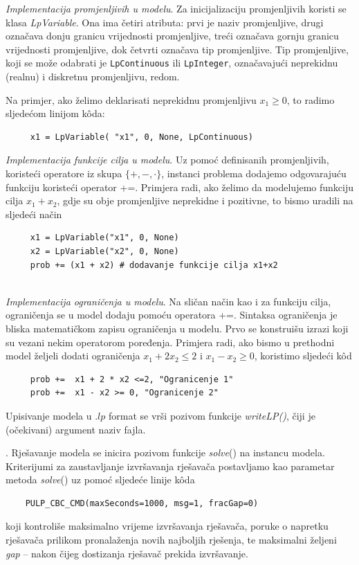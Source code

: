 \documentclass[a4paper, utf8, 11pt, colorlinks]{book}
\theoremstyle{definition}
\begin{document}
 {\emph{Implementacija promjenljivih u modelu}}.  Za inicijalizaciju promjenljivih koristi se klasa \emph{LpVariable}. Ona ima četiri atributa: prvi je naziv promjenljive, drugi označava donju granicu vrijednosti promjenljive, treći označava gornju granicu vrijednosti promjenljive, dok četvrti označava tip promjenljive. Tip promjenljive, koji se može odabrati je \texttt{LpContinuous} ili \texttt{LpInteger}, označavajući neprekidnu (realnu) i diskretnu promjenljivu, redom.  

Na primjer, ako želimo deklarisati neprekidnu promjenljivu $x_1\geq 0$, to radimo sljedećom linijom k\^oda:

\begin{verbatim}
	 x1 = LpVariable( "x1", 0, None, LpContinuous)
\end{verbatim}
 
  {\emph{Implementacija funkcije cilja u modelu}}. Uz pomoć definisanih promjenljivih, koristeći operatore iz skupa $\{+,-, \cdot\}$, instanci problema dodajemo odgovarajuću funkciju  koristeći operator +=. Primjera radi, ako želimo da modelujemo funkciju cilja $x_1 + x_2$, gdje su obje promjenljive neprekidne i pozitivne, to bismo uradili na sljedeći način
\begin{verbatim}
	 x1 = LpVariable("x1", 0, None)
	 x2 = LpVariable("x2", 0, None) 
	 prob += (x1 + x2) # dodavanje funkcije cilja x1+x2 
\end{verbatim} \\ \vspace{-1.5cm}
  {\emph{Implementacija ograničenja u modelu}}.  Na sličan način kao i za funkciju cilja, ograničenja se  u model dodaju pomoću operatora +=. Sintaksa ograničenja je bliska matematičkom zapisu ograničenja u modelu. Prvo se konstruišu izrazi koji su vezani nekim operatorom poređenja. Primjera radi, ako bismo u prethodni model željeli dodati ograničenja $x_1 + 2 x_2 \leq 2$ i $x_1-x_2 \geq 0$, koristimo sljedeći k\^od
\begin{verbatim}
	 prob +=  x1 + 2 * x2 <=2, "Ogranicenje 1"
	 prob +=  x1 - x2 >= 0, "Ogranicenje 2" 
\end{verbatim}
Upisivanje modela u .$lp$ format se vrši pozivom funkcije \emph{writeLP()}, čiji je (očekivani) argument naziv fajla. 

 . Rješavanje modela se inicira pozivom funkcije \emph{solve}() na instancu modela. Kriterijumi za zaustavljanje izvršavanja rješavača postavljamo kao parametar metoda \emph{solve}()  uz pomoć sljedeće linije k\^oda
 \begin{verbatim}
    PULP_CBC_CMD(maxSeconds=1000, msg=1, fracGap=0) 
\end{verbatim}
koji kontroliše maksimalno vrijeme izvršavanja rješavača, poruke o napretku rješavača prilikom pronalaženja novih najboljih rješenja, te maksimalni željeni \emph{gap} -- nakon čijeg dostizanja rješavač prekida izvršavanje.
\end{document}
